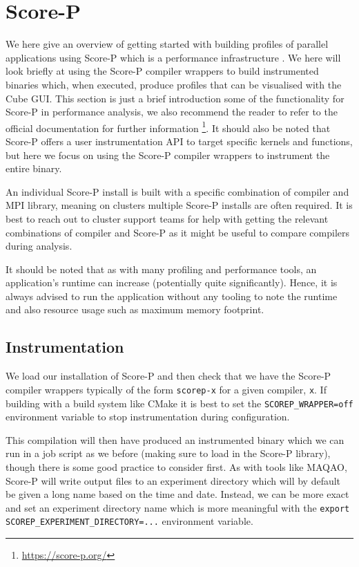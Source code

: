 \section{Score-P} 
\label{section:localisation:scorep}

We here give an overview of getting started with building profiles of parallel
applications using Score-P which is a performance infrastructure
\cite{feld2026}. We here will look briefly at using the Score-P compiler
wrappers to build instrumented binaries which, when executed, produce profiles
that can be visualised with the Cube GUI. This section is just a brief
introduction some of the functionality for Score-P in performance analysis, we
also recommend the reader to refer to the official documentation for further
information \footnote{\url{https://score-p.org/}}. It should also be noted that
Score-P offers a user instrumentation API to target specific kernels and
functions, but here we focus on using the Score-P compiler wrappers to
instrument the entire binary.

An individual Score-P install is built with a specific combination of compiler
and MPI library, meaning on clusters multiple Score-P installs are often
required. It is best to reach out to cluster support teams for help with
getting the relevant combinations of compiler and Score-P as it might be useful
to compare compilers during analysis.

It should be noted that as with many profiling and performance tools, an
application's runtime can increase (potentially quite significantly). Hence, it
is always advised to run the application without any tooling to note the
runtime and also resource usage such as maximum memory footprint.

\subsection{Instrumentation}

We load our installation of Score-P and then check that we have the Score-P
compiler wrappers typically of the form \texttt{scorep-x} for a given compiler,
\texttt{x}. If building with a build system like CMake it is best to set the
\texttt{SCOREP\_WRAPPER=off} environment variable to stop instrumentation during
configuration.

This compilation will then have produced an instrumented binary which we can
run in a job script as we before (making sure to load in the Score-P library),
though there is some good practice to consider first. As with tools like MAQAO,
Score-P will write output files to an experiment directory which will by
default be given a long name based on the time and date. Instead, we can be
more exact and set an experiment directory name which is more meaningful with
the \texttt{export SCOREP\_EXPERIMENT\_DIRECTORY=...} environment variable.

